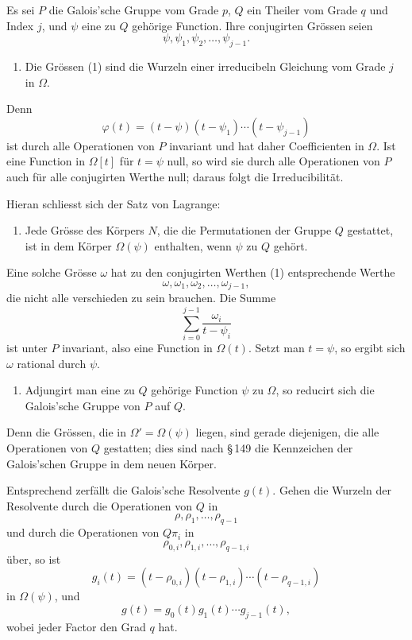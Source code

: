 \documentclass[11pt]{article}
\begin{document}
Es sei $P$ die Galois'sche Gruppe vom Grade $p$, $Q$ ein Theiler vom Grade $q$ und Index $j$, und $\psi$ eine zu $Q$ gehörige Function. Ihre conjugirten Grössen seien
\[
        \psi,
\psi_1,
\psi_2,
\ldots,
\psi_{j-1}.
\tag{1}
\]

\begin{enumerate}[label=\arabic*.,leftmargin=2em]
\item Die Grössen (1) sind die Wurzeln einer irreducibeln Gleichung vom Grade $j$ in $\Omega$.
\end{enumerate}
Denn
\[
        \varphi(t)=(t-\psi)(t-\psi_1)\cdots(t-\psi_{j-1})
\tag{2}
\]
ist durch alle Operationen von $P$ invariant und hat daher Coefficienten in $\Omega$. Ist eine Function in $\Omega[t]$ für $t=\psi$ null, so wird sie durch alle Operationen von $P$ auch für alle conjugirten Werthe null; daraus folgt die Irreducibilität.

Hieran schliesst sich der Satz von Lagrange:
\begin{enumerate}[label=\arabic*.,leftmargin=2em,start=2]
\item Jede Grösse des Körpers $N$, die die Permutationen der Gruppe $Q$ gestattet, ist in dem Körper $\Omega(\psi)$ enthalten, wenn $\psi$ zu $Q$ gehört.
\end{enumerate}

Eine solche Grösse $\omega$ hat zu den conjugirten Werthen (1) entsprechende Werthe
\[
        \omega,
\omega_1,
\omega_2,
\ldots,
\omega_{j-1},
\tag{4}
\]
die nicht alle verschieden zu sein brauchen. Die Summe
\[
        \sum_{i=0}^{j-1}
        \frac{\omega_i}{t-\psi_i}
\]
ist unter $P$ invariant, also eine Function in $\Omega(t)$. Setzt man $t=\psi$, so ergibt sich $\omega$ rational durch $\psi$.

\begin{enumerate}[label=\arabic*.,leftmargin=2em,start=3]
\item Adjungirt man eine zu $Q$ gehörige Function $\psi$ zu $\Omega$, so reducirt sich die Galois'sche Gruppe von $P$ auf $Q$.
\end{enumerate}
Denn die Grössen, die in $\Omega'=\Omega(\psi)$ liegen, sind gerade diejenigen, die alle Operationen von $Q$ gestatten; dies sind nach \S\,149 die Kennzeichen der Galois'schen Gruppe in dem neuen Körper.

Entsprechend zerfällt die Galois'sche Resolvente $g(t)$. Gehen die Wurzeln der Resolvente durch die Operationen von $Q$ in
\[
        \rho,
\rho_1,
\ldots,
\rho_{q-1}
\]
und durch die Operationen von $Q\pi_i$ in
\[
        \rho_{0,i},
\rho_{1,i},
\ldots,
\rho_{q-1,i}
\]
über, so ist
\[
        g_i(t)=(t-\rho_{0,i})(t-\rho_{1,i})
\cdots(t-\rho_{q-1,i})
\]
in $\Omega(\psi)$, und
\[
        g(t)=g_0(t)g_1(t)\cdots g_{j-1}(t),
\tag{6}
\]
wobei jeder Factor den Grad $q$ hat.
\end{document}
